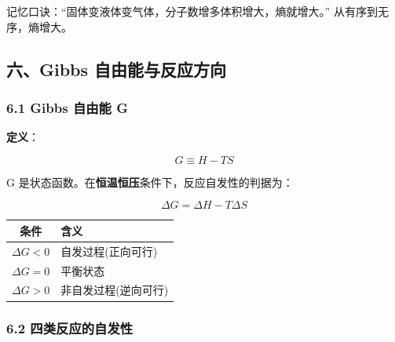 \documentclass[a4paper,11pt]{ctexart}
\newcounter{none}
\begin{document}
记忆口诀：``固体变液体变气体，分子数增多体积增大，熵就增大。'' 从有序到无序，熵增大。

\subsection{六、Gibbs 自由能与反应方向}\label{ux516dgibbs-ux81eaux7531ux80fdux4e0eux53cdux5e94ux65b9ux5411}

\subsubsection{6.1 Gibbs 自由能 G}\label{gibbs-ux81eaux7531ux80fd-g}

\textbf{定义}：

\[
G \equiv H - TS
\]

G 是状态函数。在\textbf{恒温恒压}条件下，反应自发性的判据为：

\[
\boxed{\Delta G = \Delta H - T\Delta S}
\]

{\def\LTcaptype{none} %
\begin{longtable}[]{@{}cl@{}}
\toprule\noalign{}
条件 & 含义 \\
\midrule\noalign{}
\endhead
\bottomrule\noalign{}
\endlastfoot
\(\Delta G < 0\) & 自发过程(正向可行) \\
\(\Delta G = 0\) & 平衡状态 \\
\(\Delta G > 0\) & 非自发过程(逆向可行) \\
\end{longtable}
}

\subsubsection{6.2 四类反应的自发性}\label{ux56dbux7c7bux53cdux5e94ux7684ux81eaux53d1ux6027}
\end{document}
